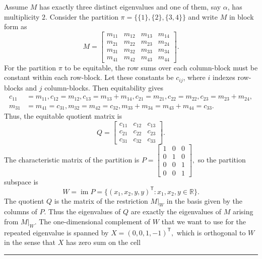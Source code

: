 \documentclass[12pt,twoside]{article}
\renewenvironment{proof}{{\noindent\bfseries Proof.}}{\qed}
\def\qed{\nolinebreak\hfill\rule{.2cm}{.2cm}\par\addvspace{.5cm}}
\begin{document}
\begin{proof}
	Assume $M$ has exactly three distinct eigenvalues and one of them,
	say $\alpha$, has multiplicity $2$. Consider the partition $\pi=\bigl\{\{1\},\{2\},\{3,4\}\bigr\}$
	and write $M$ in block form as
	$$
	M=
	\left[ \begin{array}{c|c|cc}
		m_{11} & m_{12} & m_{13} & m_{14}\\
		\hline
		m_{21} & m_{22} & m_{23} & m_{24}\\
		\hline
		m_{31} & m_{32} & m_{33} & m_{34}\\
		m_{41} & m_{42} & m_{43} & m_{44}
	\end{array} \right].
	$$
	For the partition $\pi$ to be equitable, the row sums over each column-block
	must be constant within each row-block. Let these constants be $c_{ij}$, where
	$i$ indexes row-blocks and $j$ column-blocks. Then equitability gives 
	\begin{equation}\label{eq:eq-4x4-3}
		\begin{aligned}
		c_{11}&=m_{11},
		c_{12}=m_{12},
		c_{13}=m_{13}+m_{14},	c_{21}=m_{21},
		c_{22}=m_{22},
		c_{23}=m_{23}+m_{24},\\
		m_{31}&=m_{41}=c_{31},
		m_{32}=m_{42}=c_{32},
		m_{33}+m_{34}=m_{43}+m_{44}=c_{33}.
	\end{aligned}
	\end{equation}
	Thus,  the equitable quotient matrix is
	\begin{equation}\label{eq:Q-4x4}
		Q=
		\begin{bmatrix}
			c_{11} & c_{12} & c_{13}\\
			c_{21} & c_{22} & c_{23}\\
			c_{31} & c_{32} & c_{33}
		\end{bmatrix}.
	\end{equation}
	The characteristic matrix of the partition is $P=
	\begin{bmatrix}
		1 & 0 & 0\\
		0 & 1 & 0\\
		0 & 0 & 1\\
		0 & 0 & 1
	\end{bmatrix},$	so the partition subspace is
	$$
	W  = \operatorname{im}P
	=\{(x_1,x_2,y,y)^{\mathsf T}: x_1,x_2,y\in\mathbb{R}\}.
	$$
	The quotient $Q$ is the matrix of the restriction $M|_W$ in the basis given by
	the columns of $P$. Thus the eigenvalues of $Q$ are exactly the eigenvalues of
	$M$ arising from $M|_W$. The one-dimensional complement of $W$ that we want to use for the repeated
	eigenvalue is spanned by	$X = (0,0,1,-1)^{\mathsf T},$	which is orthogonal to $W$ in the sense that $X$ has zero sum on the cell

\end{proof}
\end{document}
